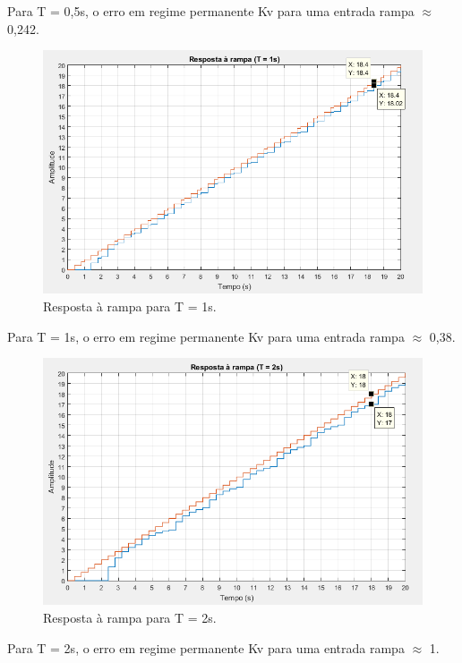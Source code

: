 \documentclass{article}
\begin{document}
    {Para T = 0,5s, o erro em regime permanente Kv para uma entrada rampa $\approx$ 0,242.}

    \vspace{7mm}
    \begin{figure}[H]
       \centering
            \includegraphics[width=1\linewidth]{images/rRamp1.png}
            \caption{Resposta à rampa para T = 1s.}
            \label{fig:rRamp1}
    \end{figure}

    {Para T = 1s, o erro em regime permanente Kv para uma entrada rampa $\approx$ 0,38.}

    \vspace{7mm}
    \begin{figure}[H]
       \centering
            \includegraphics[width=1\linewidth]{images/rRamp2.png}
            \caption{Resposta à rampa para T = 2s.}
            \label{fig:rRamp2}
    \end{figure}

    {Para T = 2s, o erro em regime permanente Kv para uma entrada rampa $\approx$ 1.}

%
\end{document}
